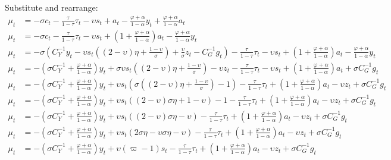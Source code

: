 Substitute and rearrange:
\begin{align}
   \mu_t &= -\sigma c_t - \frac{\tau}{1-\tau}\tau_t - \upsilon s_t + a_t -\frac{\varphi + \alpha}{1-\alpha}y_t + \frac{\varphi + \alpha}{1-\alpha}a_t\\
   \mu_t &= -\sigma c_t - \frac{\tau}{1-\tau}\tau_t - \upsilon s_t + \left(1 + \frac{\varphi + \alpha}{1-\alpha}\right)a_t -\frac{\varphi + \alpha}{1-\alpha}y_t \\
   \mu_t &= -\sigma \left(C_Y^{-1} y_t - \upsilon s_t \left( (2-\upsilon)\eta + \frac{1-\upsilon}{\sigma}\right) + \frac{\upsilon}{\sigma}z_t - C_G^{-1} g_t\right) - \frac{\tau}{1-\tau}\tau_t - \upsilon s_t + \left(1 + \frac{\varphi + \alpha}{1-\alpha}\right)a_t -\frac{\varphi + \alpha}{1-\alpha}y_t \\
   \mu_t &= -\left(\sigma C_Y^{-1} + \frac{\varphi + \alpha}{1-\alpha}\right)y_t + \sigma \upsilon s_t \left( (2-\upsilon)\eta + \frac{1-\upsilon}{\sigma}\right) - \upsilon z_t- \frac{\tau}{1-\tau}\tau_t - \upsilon s_t + \left(1 + \frac{\varphi + \alpha}{1-\alpha}\right)a_t + \sigma C_G^{-1} g_t \\
   \mu_t &= -\left(\sigma C_Y^{-1} + \frac{\varphi + \alpha}{1-\alpha}\right)y_t + \upsilon s_t \left(\sigma  \left( (2-\upsilon)\eta + \frac{1-\upsilon}{\sigma}\right)- 1 \right) - \frac{\tau}{1-\tau}\tau_t  + \left(1 + \frac{\varphi + \alpha}{1-\alpha}\right)a_t - \upsilon z_t + \sigma C_G^{-1} g_t\\
   \mu_t &= -\left(\sigma C_Y^{-1} + \frac{\varphi + \alpha}{1-\alpha}\right)y_t + \upsilon s_t \left( (2-\upsilon)\sigma \eta + {1-\upsilon}\right)- 1 - \frac{\tau}{1-\tau}\tau_t  + \left(1 + \frac{\varphi + \alpha}{1-\alpha}\right)a_t - \upsilon z_t + \sigma C_G^{-1} g_t\\
   \mu_t &= -\left(\sigma C_Y^{-1} + \frac{\varphi + \alpha}{1-\alpha}\right)y_t + \upsilon s_t \left( (2-\upsilon)\sigma \eta -\upsilon\right) - \frac{\tau}{1-\tau}\tau_t  + \left(1 + \frac{\varphi + \alpha}{1-\alpha}\right)a_t - \upsilon z_t + \sigma C_G^{-1} g_t\\
   \mu_t &= -\left(\sigma C_Y^{-1} + \frac{\varphi + \alpha}{1-\alpha}\right)y_t + \upsilon s_t \left( 2\sigma \eta-\upsilon\sigma \eta -\upsilon\right) - \frac{\tau}{1-\tau}\tau_t  + \left(1 + \frac{\varphi + \alpha}{1-\alpha}\right)a_t - \upsilon z_t + \sigma C_G^{-1} g_t\\
   \mu_t &= -\left(\sigma C_Y^{-1} + \frac{\varphi + \alpha}{1-\alpha}\right)y_t + \upsilon (\varpi - 1) s_t - \frac{\tau}{1-\tau}\tau_t  + \left(1 + \frac{\varphi + \alpha}{1-\alpha}\right)a_t - \upsilon z_t + \sigma C_G^{-1} g_t \label{eq:appendix_average_markup_end}
\end{align}